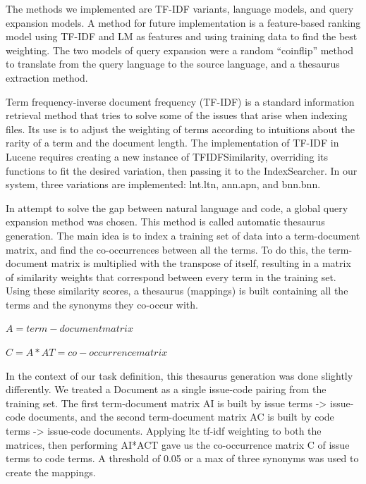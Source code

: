 \documentclass[10pt,a4paper]{article}
\begin{document}
The methods we implemented are TF-IDF variants, language models, and query expansion models. A method for future implementation is a feature-based ranking model using TF-IDF and LM as features and using training data to find the best weighting. The two models of query expansion were a random “coinflip” method to translate from the query language to the source language, and a thesaurus extraction method.
  
Term frequency-inverse document frequency (TF-IDF) is a standard information retrieval method that tries to solve some of the issues that arise when indexing files. Its use is to adjust the weighting of terms according to intuitions about the rarity of a term and the document length. The implementation of TF-IDF in Lucene requires creating a new instance of TFIDFSimilarity, overriding its functions to fit the desired variation, then passing it to the IndexSearcher. In our system, three variations are implemented: lnt.ltn, ann.apn, and bnn.bnn.

In attempt to solve the gap between natural language and code, a global query expansion method was chosen. This method is called automatic thesaurus generation. The main idea is to index a training set of data into a term-document matrix, and find the co-occurrences between all the terms. To do this, the term-document matrix is multiplied with the transpose of itself, resulting in a matrix of similarity weights that correspond between every term in the training set. Using these similarity scores, a thesaurus (mappings) is built containing all the terms and the synonyms they co-occur with. 

\begin{center}
    $A = term-document matrix$
\end{center}

\begin{center}
    $C = A*AT = co-occurrence matrix$
\end{center}

In the context of our task definition, this thesaurus generation was done slightly differently. We treated a Document as a single issue-code pairing from the training set. The first term-document matrix AI is built by issue terms -> issue-code documents, and the second term-document matrix AC is built by code terms -> issue-code documents. Applying ltc tf-idf weighting to both the matrices, then performing AI*ACT gave us the co-occurrence matrix C of issue terms to code terms. A threshold of 0.05 or a max of three synonyms was used to create the mappings.
\end{document}
